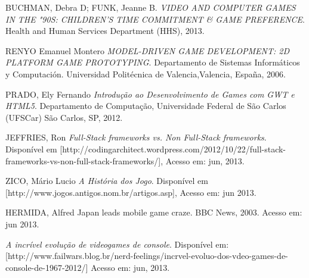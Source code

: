 \documentclass{article}
\begin{document}
\begin{thebibliography}{99}
BUCHMAN, Debra D; FUNK, Jeanne B. 
\emph{VIDEO AND COMPUTER GAMES IN THE "90S: CHILDREN'S TIME COMMITMENT & GAME PREFERENCE}. 
Health and Human Services Department (HHS), 2013.


RENYO Emanuel Montero 
\emph{MODEL-DRIVEN GAME DEVELOPMENT: 2D PLATFORM GAME PROTOTYPING}. 
Departamento de Sistemas Informáticos y Computación. Universidad Politécnica de Valencia,Valencia, España, 2006.


PRADO, Ely Fernando
\emph{Introdução ao Desenvolvimento de Games com GWT e HTML5}. 
Departamento de Computação, Universidade Federal de São Carlos (UFSCar) São Carlos, SP, 2012.

JEFFRIES, Ron 
\emph{Full-Stack frameworks vs. Non Full-Stack frameworks}.
Disponível em [http://codingarchitect.wordpress.com/2012/10/22/full-stack-frameworks-vs-non-full-stack-frameworks/], Acesso em: jun, 2013.

ZICO, Mário Lucio 
\emph{A História dos Jogo}. 
Disponível em [http://www.jogos.antigos.nom.br/artigos.asp], Acesso em: jun 2013.


HERMIDA, Alfred 
Japan leads mobile game craze. BBC News, 2003. Acesso em: jun 2013.

\emph{A incrível evolução de videogames de console}. 
Disponível em: [http://www.failwars.blog.br/nerd-feelings/incrvel-evoluo-dos-vdeo-games-de-console-de-1967-2012/] Acesso em: jun, 2013.


\end{thebibliography}

\printindex[not]

\printindex[list]

\printindex
\end{document}
